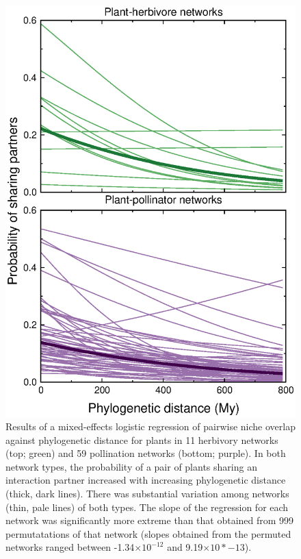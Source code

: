 \documentclass[12pt]{article}
\begin{document}
  \begin{figure}[!h]
    \begin{center}
      \centerline{\includegraphics*[width=.75\textwidth]{Figures/dataplots/scaled_regression_lines_full_color.eps}}
    \end{center}
     \caption{Results of a mixed-effects logistic regression of pairwise niche overlap
     against phylogenetic distance for plants in 11
     herbivory networks (top; green) and 59 pollination
     networks (bottom; purple). In both network types, the probability of a pair of plants
     sharing an interaction partner increased with increasing phylogenetic distance (thick,
     dark lines). There was substantial variation among networks (thin, pale lines) of both types. The slope of the regression for each network was significantly more extreme than that obtained from 999 permutatations of that network (slopes obtained from the permuted networks ranged between -1.34$\times10^{-12}$ and 9.19$\times10*{-13}$).}
    \label{within_network_regression} 
  \end{figure}
\end{document}

